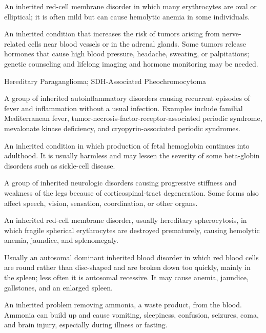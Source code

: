  An inherited red-cell membrane disorder in which many erythrocytes are oval or elliptical; it is often mild but can cause hemolytic anemia in some individuals.

 An inherited condition that increases the risk of tumors arising from nerve-related cells near blood vessels or in the adrenal glands. Some tumors release hormones that cause high blood pressure, headache, sweating, or palpitations; genetic counseling and lifelong imaging and hormone monitoring may be needed.

\synonyms
Hereditary Paraganglioma; SDH-Associated Pheochromocytoma

 A group of inherited autoinflammatory disorders causing recurrent episodes of fever and inflammation without a usual infection. Examples include familial Mediterranean fever, tumor-necrosis-factor-receptor-associated periodic syndrome, mevalonate kinase deficiency, and cryopyrin-associated periodic syndromes.

 An inherited condition in which production of fetal hemoglobin continues into adulthood. It is usually harmless and may lessen the severity of some beta-globin disorders such as sickle-cell disease.

 A group of inherited neurologic disorders causing progressive stiffness and weakness of the legs because of corticospinal-tract degeneration. Some forms also affect speech, vision, sensation, coordination, or other organs.

 An inherited red-cell membrane disorder, usually hereditary spherocytosis, in which fragile spherical erythrocytes are destroyed prematurely, causing hemolytic anemia, jaundice, and splenomegaly.

 Usually an autosomal dominant inherited blood disorder in which red blood cells are round rather than disc-shaped and are broken down too quickly, mainly in the spleen; less often it is autosomal recessive. It may cause anemia, jaundice, gallstones, and an enlarged spleen.

 An inherited problem removing ammonia, a waste product, from the blood. Ammonia can build up and cause vomiting, sleepiness, confusion, seizures, coma, and brain injury, especially during illness or fasting.

